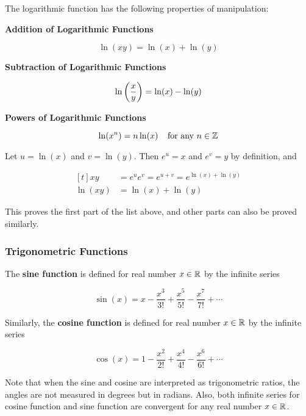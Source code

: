 \documentclass[a4paper,12pt]{article}
\begin{document}
\begin{pst}
  The logarithmic function has the following properties of manipulation:

  \begin{alist}
    \item \textbf{Addition of Logarithmic Functions}

    $$\ln(xy)=\ln(x)+\ln(y)$$

    \item \textbf{Subtraction of Logarithmic Functions}

    $$\ln\left( \frac{x}{y}\right)=\ln(x)-\ln(y)$$

    \item \textbf{Powers of Logarithmic Functions}

    $$\ln(x^{n})=n\ln(x)\;\;\;\;\text{for any }n\in \mathbb{Z}$$
  \end{alist}

  \prf Let $u=\ln(x)$ and $v=\ln(y)$. Then $e^{u}=x$ and $e^{v}=y$ by definition, and

  $$\begin{aligned}[t]
    xy&=e^{u}e^{v}=e^{u+v}=e^{\ln(x)+\ln(y)}\\
    \ln(xy)&=\ln(x)+\ln(y)
  \end{aligned}$$\s

  This proves the first part of the list above, and other parts can also be proved similarly.
\end{pst}

\subsubsection{Trigonometric Functions}
\begin{dft}
  The \textbf{sine function} is defined for real number $x\in \mathbb{R}$ by the infinite series

  $$\sin(x)=x-\frac{x^{3}}{3!}+\frac{x^{5}}{5!}-\frac{x^{7}}{7!}+\cdots$$\s

  Similarly, the \textbf{cosine function} is defined for real number $x\in \mathbb{R}$ by the infinite series

  $$\cos(x)=1-\frac{x^{2}}{2!}+\frac{x^{4}}{4!}-\frac{x^{6}}{6!}+\cdots$$
\end{dft}\n

Note that when the sine and cosine are interpreted as trigonometric ratios, the angles are not measured in degrees but in radians. Also, both infinite series for cosine function and sine function are convergent for any real number $x\in \mathbb{R}$.\n
\end{document}
